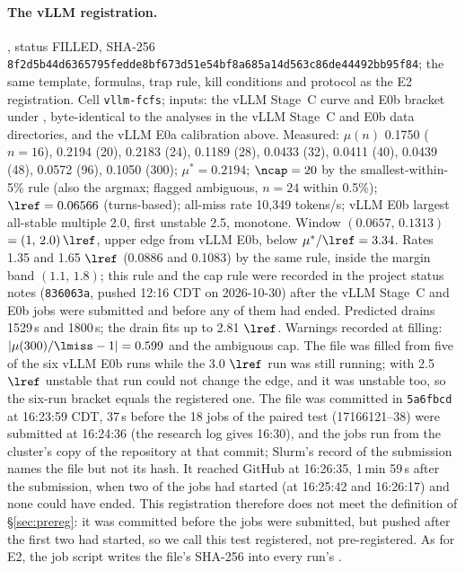 \paragraph{The vLLM registration.} , status FILLED, SHA-256 \texttt{8f2d5b44d6365795fedde8bf673d51e5\allowbreak 4bf8a685a14d563c86de44492bb95f84}; the same template, formulas, trap rule, kill conditions and protocol as the E2 registration. Cell \texttt{vllm-fcfs}; inputs: the vLLM Stage~C curve and E0b bracket under , byte-identical to the analyses in the vLLM Stage~C and E0b data directories, and the vLLM E0a calibration above. Measured: $\mu(n)$ 0.1750 ($n=16$), 0.2194 (20), 0.2183 (24), 0.1189 (28), 0.0433 (32), 0.0411 (40), 0.0439 (48), 0.0572 (96), 0.1050 (300); $\mu^*=0.2194$; $\ncap=20$ by the smallest-within-5\% rule (also the argmax; flagged ambiguous, $n=24$ within 0.5\%); $\lref=0.06566$ (turns-based); all-miss rate 10,349 tokens/s; vLLM E0b largest all-stable multiple 2.0, first unstable 2.5, monotone. Window $(0.0657,\,0.1313)$\sps{} $=(1,\,2.0)\,\lref$, upper edge from vLLM E0b, below $\mu^*/\lref=3.34$. Rates 1.35 and 1.65 $\lref$ (0.0886 and 0.1083\sps) by the same rule, inside the margin band $(1.1,\,1.8)$; this rule and the cap rule were recorded in the project status notes (\texttt{836063a}, pushed 12:16 CDT on 2026-10-30) after the vLLM Stage~C and E0b jobs were submitted and before any of them had ended. Predicted drains 1529\,s and 1800\,s; the drain fits up to 2.81 $\lref$. Warnings recorded at filling: $|\mu(300)/\lmiss-1|=0.599$ and the ambiguous cap. The file was filled from five of the six vLLM E0b runs while the 3.0 $\lref$ run was still running; with 2.5 $\lref$ unstable that run could not change the edge, and it was unstable too, so the six-run bracket equals the registered one. The file was committed in \texttt{5a6fbcd} at 16:23:59 CDT, 37\,s before the 18 jobs of the paired test (17166121--38) were submitted at 16:24:36 (the research log gives 16:30), and the jobs run from the cluster's copy of the repository at that commit; Slurm's record of the submission names the file but not its hash. It reached GitHub at 16:26:35, 1\,min 59\,s after the submission, when two of the jobs had started (at 16:25:42 and 16:26:17) and none could have ended. This registration therefore does not meet the definition of \S\ref{sec:prereg}: it was committed before the jobs were submitted, but pushed after the first two had started, so we call this test registered, not pre-registered. As for E2, the job script writes the file's SHA-256 into every run's .

